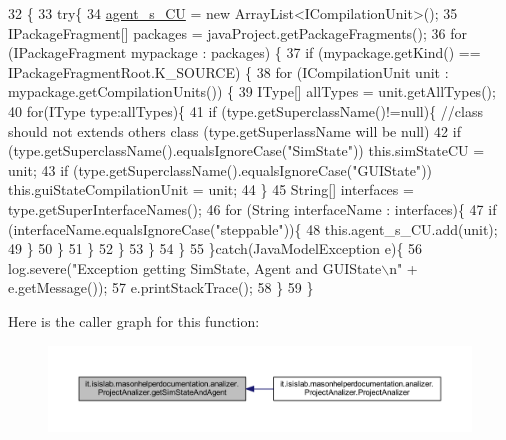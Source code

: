 \begin{DoxyCode}
32                                        \{
33         \textcolor{keywordflow}{try}\{
34             \hyperlink{classit_1_1isislab_1_1masonhelperdocumentation_1_1analizer_1_1_project_analizer_ad495cee63b37e3bf36c81ccf896f9ce2}{agent\_s\_CU} = \textcolor{keyword}{new} ArrayList<ICompilationUnit>();
35             IPackageFragment[] packages = javaProject.getPackageFragments();
36             \textcolor{keywordflow}{for} (IPackageFragment mypackage : packages) \{
37               \textcolor{keywordflow}{if} (mypackage.getKind() == IPackageFragmentRoot.K\_SOURCE) \{
38                   \textcolor{keywordflow}{for} (ICompilationUnit unit : mypackage.getCompilationUnits()) \{
39                       IType[] allTypes = unit.getAllTypes();
40                       \textcolor{keywordflow}{for}(IType type:allTypes)\{
41                           \textcolor{keywordflow}{if} (type.getSuperclassName()!=null)\{  \textcolor{comment}{//class should not extends others class
       (type.getSuperlassName will be null)}
42                               \textcolor{keywordflow}{if} (type.getSuperclassName().equalsIgnoreCase(\textcolor{stringliteral}{"SimState"}))    this.simStateCU
       = unit;
43                               \textcolor{keywordflow}{if} (type.getSuperclassName().equalsIgnoreCase(\textcolor{stringliteral}{"GUIState"}))    
      this.guiStateCompilationUnit = unit;
44                           \}
45                           String[] interfaces = type.getSuperInterfaceNames();
46                           \textcolor{keywordflow}{for} (String interfaceName : interfaces)\{
47                               \textcolor{keywordflow}{if} (interfaceName.equalsIgnoreCase(\textcolor{stringliteral}{"steppable"}))\{
48                                   this.agent\_s\_CU.add(unit);
49                               \}
50                           \}
51                       \}
52                 \}   
53               \}
54             \}
55         \}\textcolor{keywordflow}{catch}(JavaModelException e)\{
56             log.severe(\textcolor{stringliteral}{"Exception getting SimState, Agent and GUIState\(\backslash\)n"} + e.getMessage());
57             e.printStackTrace();
58         \}
59     \}
\end{DoxyCode}


Here is the caller graph for this function\-:\nopagebreak
\begin{figure}[H]
\begin{center}
\leavevmode
\includegraphics[width=350pt]{classit_1_1isislab_1_1masonhelperdocumentation_1_1analizer_1_1_project_analizer_af2dfc3e88c4c1411d928017ed4957e1c_icgraph}
\end{center}
\end{figure}


